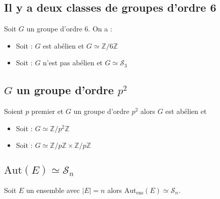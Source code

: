 \documentclass[a4paper,10pt]{report}
\newcommand{\IZ}{\mathbb{Z}} %
\newcommand{\Autens}[1]{\text{Aut}_{\text{ens}}\left(#1\right)}
\newcommand{\Aut}[1]{\text{Aut}\left(#1\right)}
\begin{document}
   \subsection{Il y a deux classes de groupes d'ordre 6}
    Soit $G$ un groupe d'ordre 6. On a :
    \begin{itemize}
      \item Soit : $G$ est abélien et $G \simeq \IZ/6\IZ$
      \item Soit : $G$ n'est pas abélien et $G \simeq \mathcal{S}_3$
    \end{itemize}

   \subsection{$G$ un groupe d'ordre $p^2$}
    Soient $p$ premier et $G$ un groupe d'ordre $p^2$ alors $G$ est abélien et 
    \begin{itemize}
      \item Soit : $G\simeq \IZ/p^2\IZ$
      \item Soit : $G\simeq \IZ/p\IZ \times \IZ/p\IZ$	
    \end{itemize}
    \begin{comment}
      Preuve : 17/12/08 p1
    \end{comment}

   \subsection{$\Aut{E} \simeq \mathcal{S}_n$}
    Soit $E$ un ensemble avec $|E|=n$ alors $\Autens{E}\simeq \mathcal{S}_n$.
    \begin{comment}
      Preuve : 17/12/08 p2
    \end{comment}
\end{document}

